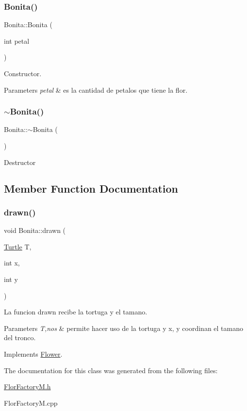 \subsubsection{\texorpdfstring{Bonita()}{Bonita()}}
{\footnotesize\ttfamily Bonita\+::\+Bonita (\begin{DoxyParamCaption}\item[{int}]{petal }\end{DoxyParamCaption})}

Constructor. 
\begin{DoxyParams}{Parameters}
{\em petal} & es la cantidad de petalos que tiene la flor. \\
\hline
\end{DoxyParams}
\mbox{\label{classBonita_a22bbc0d05b2e811ffa30ea73201eda07}} 
\subsubsection{\texorpdfstring{$\sim$\+Bonita()}{~Bonita()}}
{\footnotesize\ttfamily Bonita\+::$\sim$\+Bonita (\begin{DoxyParamCaption}{ }\end{DoxyParamCaption})}

Destructor 

\subsection{Member Function Documentation}
\mbox{\label{classBonita_ae8b76e1290313f077869b2ea876cab7f}} 
\subsubsection{\texorpdfstring{drawn()}{drawn()}}
{\footnotesize\ttfamily void Bonita\+::drawn (\begin{DoxyParamCaption}\item[{\hyperlink{classTurtle}{Turtle}}]{T,  }\item[{int}]{x,  }\item[{int}]{y }\end{DoxyParamCaption})\hspace{0.3cm}{\ttfamily [virtual]}}

La funcion drawn recibe la tortuga y el tamano. 
\begin{DoxyParams}{Parameters}
{\em T,nos} & permite hacer uso de la tortuga y x, y coordinan el tamano del tronco. \\
\hline
\end{DoxyParams}


Implements \hyperlink{classFlower_af01eea570f9d02e16cda1d86ee97633c}{Flower}.



The documentation for this class was generated from the following files\+:\begin{DoxyCompactItemize}
\item 
\hyperlink{FlorFactoryM_8h}{Flor\+Factory\+M.\+h}\item 
Flor\+Factory\+M.\+cpp\end{DoxyCompactItemize}
